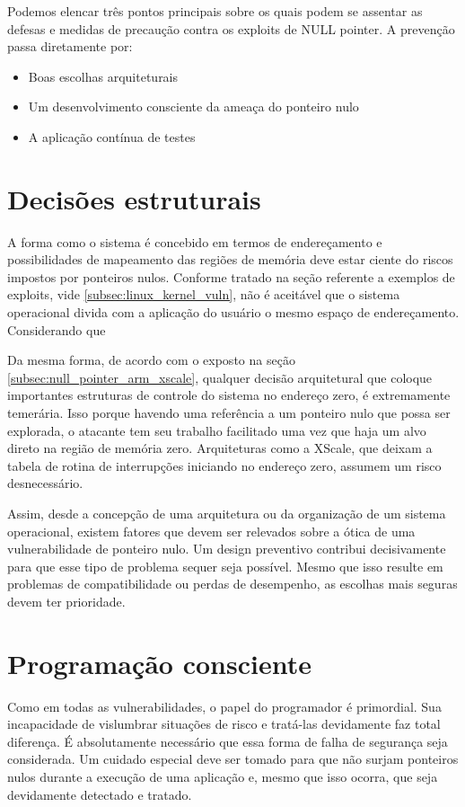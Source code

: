 		Podemos elencar três pontos principais sobre os quais podem se assentar as defesas
		e medidas de precaução contra os exploits de NULL pointer.
		A prevenção passa diretamente por:
		\begin{itemize}
			\item{Boas escolhas arquiteturais}
			\item{Um desenvolvimento consciente da ameaça do ponteiro nulo}
			\item{A aplicação contínua de testes}
		\end{itemize}
	
		\section{Decisões estruturais}		
			A forma como o sistema é concebido em termos de endereçamento e possibilidades de mapeamento
			das regiões de memória deve estar ciente do riscos impostos por ponteiros nulos.
			Conforme tratado na seção referente a exemplos de exploits, vide \ref{subsec:linux_kernel_vuln},
			não é aceitável que o sistema operacional divida com a aplicação do usuário o mesmo espaço
			de endereçamento. Considerando que

			
			Da mesma forma, de acordo com o exposto na seção \ref{subsec:null_pointer_arm_xscale}, 
			qualquer decisão arquitetural que coloque importantes estruturas de controle do sistema no 
			endereço zero, é extremamente temerária.
			Isso porque havendo uma referência a um ponteiro nulo que possa ser explorada, o atacante
			tem seu trabalho facilitado uma vez que haja um alvo direto na região de memória zero.
			Arquiteturas como a XScale, que deixam a tabela de rotina de interrupções iniciando no endereço zero,
			assumem um risco desnecessário.


			Assim, desde a concepção de uma arquitetura ou da organização de um sistema operacional,
			existem fatores que devem ser relevados sobre a ótica de uma vulnerabilidade de ponteiro nulo.
			Um design preventivo contribui decisivamente para que esse tipo de problema sequer seja possível.
			Mesmo que isso resulte em problemas de compatibilidade ou perdas de desempenho, as escolhas
			mais seguras devem ter prioridade.

		\section{Programação consciente}
			Como em todas as vulnerabilidades, o papel do programador é primordial.
			Sua incapacidade de vislumbrar situações de risco e tratá-las devidamente faz total diferença.
			É absolutamente necessário que essa forma de falha de segurança seja considerada.
			Um cuidado especial deve ser tomado para que não surjam ponteiros nulos
			durante a execução de uma aplicação e, mesmo que isso ocorra, que seja devidamente
			detectado e tratado.


